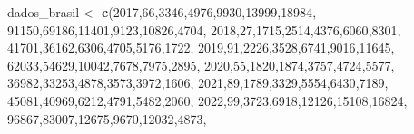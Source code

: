 \documentclass[
]{article}
\newenvironment{Shaded}{\begin{snugshade}}{\end{snugshade}}
\newcommand{\DecValTok}[1]{\textcolor[rgb]{0.00,0.00,0.81}{#1}}
\newcommand{\FunctionTok}[1]{\textcolor[rgb]{0.13,0.29,0.53}{\textbf{#1}}}
\newcommand{\NormalTok}[1]{#1}
\newcommand{\OtherTok}[1]{\textcolor[rgb]{0.56,0.35,0.01}{#1}}
\begin{document}
\begin{Shaded}
\begin{Highlighting}[]
\NormalTok{dados\_brasil }\OtherTok{\textless{}{-}} \FunctionTok{c}\NormalTok{(}\DecValTok{2017}\NormalTok{,}\DecValTok{66}\NormalTok{,}\DecValTok{3346}\NormalTok{,}\DecValTok{4976}\NormalTok{,}\DecValTok{9930}\NormalTok{,}\DecValTok{13999}\NormalTok{,}\DecValTok{18984}\NormalTok{,}
                    \DecValTok{91150}\NormalTok{,}\DecValTok{69186}\NormalTok{,}\DecValTok{11401}\NormalTok{,}\DecValTok{9123}\NormalTok{,}\DecValTok{10826}\NormalTok{,}\DecValTok{4704}\NormalTok{,}
                  \DecValTok{2018}\NormalTok{,}\DecValTok{27}\NormalTok{,}\DecValTok{1715}\NormalTok{,}\DecValTok{2514}\NormalTok{,}\DecValTok{4376}\NormalTok{,}\DecValTok{6060}\NormalTok{,}\DecValTok{8301}\NormalTok{,}
                    \DecValTok{41701}\NormalTok{,}\DecValTok{36162}\NormalTok{,}\DecValTok{6306}\NormalTok{,}\DecValTok{4705}\NormalTok{,}\DecValTok{5176}\NormalTok{,}\DecValTok{1722}\NormalTok{,}
                  \DecValTok{2019}\NormalTok{,}\DecValTok{91}\NormalTok{,}\DecValTok{2226}\NormalTok{,}\DecValTok{3528}\NormalTok{,}\DecValTok{6741}\NormalTok{,}\DecValTok{9016}\NormalTok{,}\DecValTok{11645}\NormalTok{,}
                    \DecValTok{62033}\NormalTok{,}\DecValTok{54629}\NormalTok{,}\DecValTok{10042}\NormalTok{,}\DecValTok{7678}\NormalTok{,}\DecValTok{7975}\NormalTok{,}\DecValTok{2895}\NormalTok{,}
                  \DecValTok{2020}\NormalTok{,}\DecValTok{55}\NormalTok{,}\DecValTok{1820}\NormalTok{,}\DecValTok{1874}\NormalTok{,}\DecValTok{3757}\NormalTok{,}\DecValTok{4724}\NormalTok{,}\DecValTok{5577}\NormalTok{,}
                    \DecValTok{36982}\NormalTok{,}\DecValTok{33253}\NormalTok{,}\DecValTok{4878}\NormalTok{,}\DecValTok{3573}\NormalTok{,}\DecValTok{3972}\NormalTok{,}\DecValTok{1606}\NormalTok{,}
                  \DecValTok{2021}\NormalTok{,}\DecValTok{89}\NormalTok{,}\DecValTok{1789}\NormalTok{,}\DecValTok{3329}\NormalTok{,}\DecValTok{5554}\NormalTok{,}\DecValTok{6430}\NormalTok{,}\DecValTok{7189}\NormalTok{,}
                    \DecValTok{45081}\NormalTok{,}\DecValTok{40969}\NormalTok{,}\DecValTok{6212}\NormalTok{,}\DecValTok{4791}\NormalTok{,}\DecValTok{5482}\NormalTok{,}\DecValTok{2060}\NormalTok{,}
                  \DecValTok{2022}\NormalTok{,}\DecValTok{99}\NormalTok{,}\DecValTok{3723}\NormalTok{,}\DecValTok{6918}\NormalTok{,}\DecValTok{12126}\NormalTok{,}\DecValTok{15108}\NormalTok{,}\DecValTok{16824}\NormalTok{,}
                    \DecValTok{96867}\NormalTok{,}\DecValTok{83007}\NormalTok{,}\DecValTok{12675}\NormalTok{,}\DecValTok{9670}\NormalTok{,}\DecValTok{12032}\NormalTok{,}\DecValTok{4873}\NormalTok{,}

\end{Highlighting}
\end{Shaded}
\end{document}
